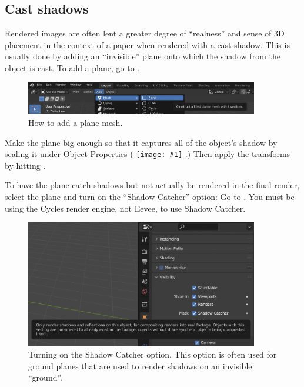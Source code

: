 \documentclass[10pt]{article}
\DeclareRobustCommand{\inlinepic}[1]{%
  \begingroup\normalfont
  \texttt{[image: \#1]}%
  \endgroup
}
\begin{document}
\subsection{Cast shadows}

Rendered images are often lent a greater degree of ``realness'' and sense of 3D placement in the context of a paper when rendered with a cast shadow. This is usually done by adding an ``invisible'' plane onto which the shadow from the object is cast. To add a plane, go to .
\begin{figure}[H]
    \centering
    \captionsetup{width=0.8\textwidth}
    \includegraphics[width=4in]{images/add-a-plane-mesh.png}
    \caption{How to add a plane mesh.}
\end{figure}
Make the plane big enough so that it captures all of the object's shadow by scaling it under Object Properties (\inlinepic{images/object-properties-icon.png}.) Then apply the transforms by hitting .

To have the plane catch shadows but not actually be rendered in the final render, select the plane and turn on the ``Shadow Catcher'' option: Go to . You must be using the Cycles render engine, not Eevee, to use Shadow Catcher.
\begin{figure}[H]
    \centering
    \captionsetup{width=0.8\textwidth}
    \includegraphics[width=4in]{images/shadow-catcher-option.png}
    \caption{Turning on the Shadow Catcher option. This option is often used for ground planes that are used to render shadows on an invisible ``ground''.}
    \label{fig:shadow-catcher-option}
\end{figure}
\end{document}
